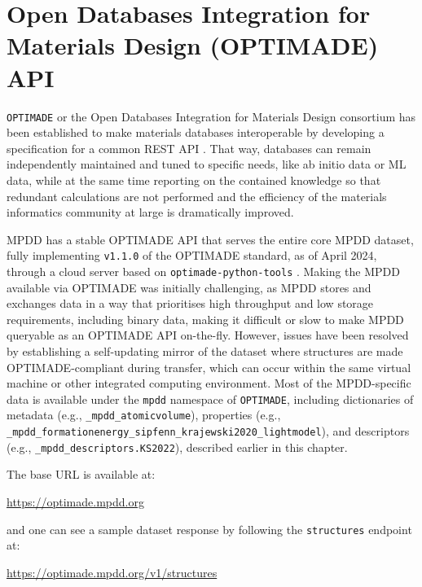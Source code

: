 \section{Open Databases Integration for Materials Design (OPTIMADE) API} \label{mpdd:sec:optimade}

\texttt{OPTIMADE} or the Open Databases Integration for Materials Design consortium has been established to make materials databases interoperable by developing a specification for a common REST API \cite{Evans2024DevelopmentsExchange}. That way, databases can remain independently maintained and tuned to specific needs, like ab initio data or ML data, while at the same time reporting on the contained knowledge so that redundant calculations are not performed and the efficiency of the materials informatics community at large is dramatically improved.

MPDD has a stable OPTIMADE API that serves the entire core MPDD dataset, fully implementing \texttt{v1.1.0} of the OPTIMADE standard, as of April 2024, through a cloud server based on \texttt{optimade-python-tools} \cite{Evans2021}.
Making the MPDD available via OPTIMADE was initially challenging, as MPDD stores and exchanges data in a way that prioritises high throughput and low storage requirements, including binary data, making it difficult or slow to make MPDD queryable as an OPTIMADE API on-the-fly.
However, issues have been resolved by establishing a self-updating mirror of the dataset where structures are made OPTIMADE-compliant during transfer, which can occur within the same virtual machine or other integrated computing environment. Most of the MPDD-specific data is available under the \texttt{mpdd} namespace of \texttt{OPTIMADE}, including dictionaries of metadata (e.g., \texttt{\_mpdd\_atomicvolume}), properties (e.g., \texttt{\_mpdd\_formationenergy\_sipfenn\_krajewski2020\_lightmodel}), and descriptors (e.g., \texttt{\_mpdd\_descriptors.KS2022}), described earlier in this chapter.

The base URL is available at:

\hspace{24pt} \href{https://optimade.mpdd.org}{https://optimade.mpdd.org}

and one can see a sample dataset response by following the \texttt{structures} endpoint at:

\hspace{24pt} \href{https://optimade.mpdd.org/v1/structures}{https://optimade.mpdd.org/v1/structures}



\printbibliography[heading=subbibintoc]